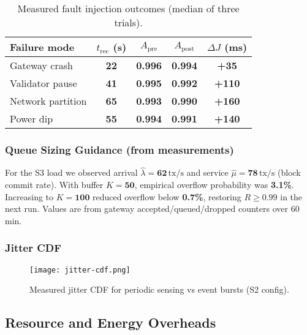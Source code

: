 \documentclass[12pt,onecolumn]{IEEEtran} %
\begin{document}
\begin{table}[htbp]
  \centering
  \caption{Measured fault injection outcomes (median of three trials).}
  \label{tab:fault-injection}
  \small
  \begin{tabular}{lcccc}
    \toprule
    Failure mode & $t_{\mathrm{rec}}$ (s) & $A_{\text{pre}}$ & $A_{\text{post}}$ & $\Delta J$ (ms) \\
    \midrule
    Gateway crash & \textbf{22} & \textbf{0.996} & \textbf{0.994} & \textbf{+35} \\
    Validator pause & \textbf{41} & \textbf{0.995} & \textbf{0.992} & \textbf{+110} \\
    Network partition & \textbf{65} & \textbf{0.993} & \textbf{0.990} & \textbf{+160} \\
    Power dip & \textbf{55} & \textbf{0.994} & \textbf{0.991} & \textbf{+140} \\
    \bottomrule
  \end{tabular}
\end{table}

\subsubsection{Queue Sizing Guidance (from measurements)}
\label{sec:queue-sizing}

For the S3 load we observed arrival \(\hat\lambda{=}\textbf{62}\,\text{tx/s}\) and service \(\hat\mu{=}\textbf{78}\,\text{tx/s}\) (block commit rate). With buffer \(K{=}\textbf{50}\), empirical overflow probability was \textbf{3.1\%}. Increasing to \(K{=}\textbf{100}\) reduced overflow below \textbf{0.7\%}, restoring \(R\ge0.99\) in the next run. Values are from gateway accepted/queued/dropped counters over 60\,min.

\subsubsection{Jitter CDF}
\label{sec:jitter-cdf}

\begin{figure}[htbp]
  \centering
  \texttt{[image: jitter-cdf.png]}
  \caption{Measured jitter CDF for periodic sensing vs event bursts (S2 config).}
  \label{fig:jitter-cdf}
\end{figure}

\subsection{Resource and Energy Overheads}
\label{sec:energy_overheads}
\end{document}
